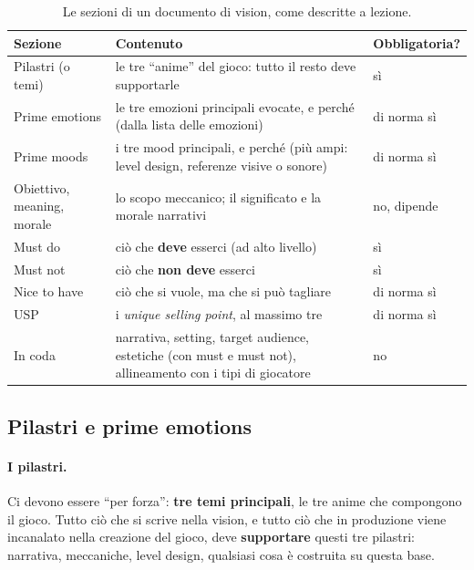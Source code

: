 \begin{table}[htbp]
  \centering
  \caption{Le sezioni di un documento di vision, come descritte a lezione.}
  \label{gd9:tab:vision}
  \small
  \begin{tabular}{@{}p{}p{}p{}@{}}
    \toprule
    \textbf{Sezione} & \textbf{Contenuto} & \textbf{Obbligatoria?} \\
    \midrule
    Pilastri (o temi) & le tre ``anime'' del gioco: tutto il resto deve
      supportarle & sì \\
    \addlinespace
    Prime emotions & le tre emozioni principali evocate, e perché (dalla
      lista delle emozioni) & di norma sì \\
    Prime moods & i tre mood principali, e perché (più ampi: level design,
      referenze visive o sonore) & di norma sì \\
    \addlinespace
    Obiettivo, meaning, morale & lo scopo meccanico; il significato e la
      morale narrativi & no, dipende \\
    \addlinespace
    Must do & ciò che \textbf{deve} esserci (ad alto livello) & sì \\
    Must not & ciò che \textbf{non deve} esserci & sì \\
    Nice to have & ciò che si vuole, ma che si può tagliare & di norma sì \\
    USP & i \emph{unique selling point}, al massimo tre & di norma sì \\
    \addlinespace
    In coda & narrativa, setting, target audience, estetiche (con must e
      must not), allineamento con i tipi di giocatore & no \\
    \bottomrule
  \end{tabular}
\end{table}

\subsection{Pilastri e prime emotions}

\paragraph{I pilastri.} Ci devono essere ``per forza'': \textbf{tre temi
principali}, le tre anime che compongono il gioco. Tutto ciò che si scrive
nella vision, e tutto ciò che in produzione viene incanalato nella creazione
del gioco, deve \textbf{supportare} questi tre pilastri: narrativa,
meccaniche, level design, qualsiasi cosa è costruita su questa base.

